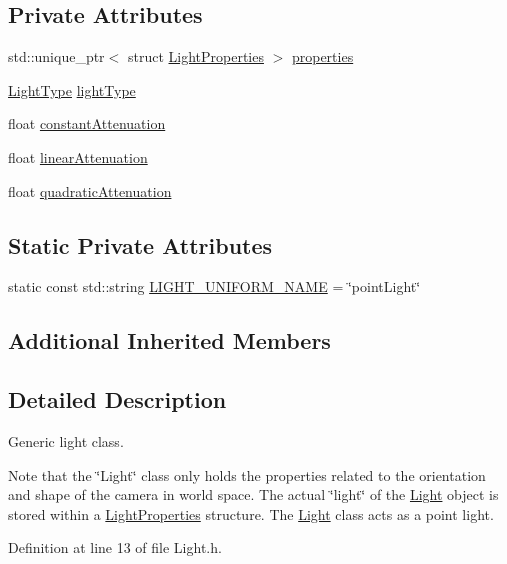 \subsection*{Private Attributes}
\begin{DoxyCompactItemize}
\item 
std\+::unique\+\_\+ptr$<$ struct \hyperlink{struct_light_properties}{Light\+Properties} $>$ \hyperlink{class_light_a74eba4cac1cc27e741230fbda32fceef}{properties}
\item 
\hyperlink{class_light_a661d9480e01af8b1612860b9630ef5f8}{Light\+Type} \hyperlink{class_light_ab0c279c927973443f7b52fc924b489aa}{light\+Type}
\item 
float \hyperlink{class_light_afef6c00a21aa16dc6cc7a7fb1639d2fa}{constant\+Attenuation}
\item 
float \hyperlink{class_light_afcb2da592197efae015ae16c1c5bfceb}{linear\+Attenuation}
\item 
float \hyperlink{class_light_a0f24dde11cbbd12d0f0309e189f3640c}{quadratic\+Attenuation}
\end{DoxyCompactItemize}
\subsection*{Static Private Attributes}
\begin{DoxyCompactItemize}
\item 
static const std\+::string \hyperlink{class_light_ab2d40f6c364cf728d03a90ff885e37cb}{L\+I\+G\+H\+T\+\_\+\+U\+N\+I\+F\+O\+R\+M\+\_\+\+N\+A\+M\+E} = \char`\"{}point\+Light\char`\"{}
\end{DoxyCompactItemize}
\subsection*{Additional Inherited Members}


\subsection{Detailed Description}
Generic light class. 

Note that the \char`\"{}\+Light\char`\"{} class only holds the properties related to the orientation and shape of the camera in world space. The actual \char`\"{}light\char`\"{} of the \hyperlink{class_light}{Light} object is stored within a \hyperlink{struct_light_properties}{Light\+Properties} structure. The \hyperlink{class_light}{Light} class acts as a point light. 

Definition at line 13 of file Light.\+h.




